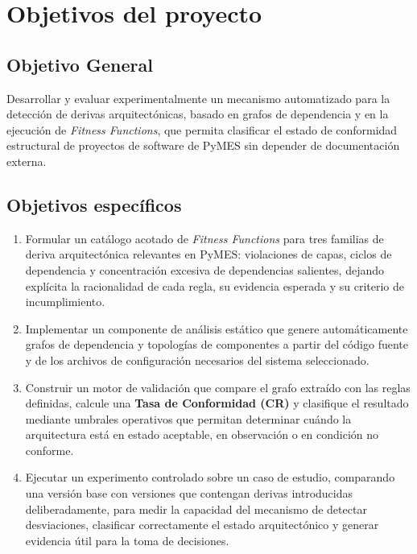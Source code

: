 \section{Objetivos del proyecto}


\subsection{Objetivo General}
Desarrollar y evaluar experimentalmente un mecanismo automatizado para la detección de derivas arquitectónicas, basado en grafos de dependencia y en la ejecución de \textit{Fitness Functions}, que permita clasificar el estado de conformidad estructural de proyectos de software de PyMES sin depender de documentación externa.


\subsection{Objetivos específicos}

\begin{enumerate}
    \item Formular un catálogo acotado de \textit{Fitness Functions} para tres familias de deriva arquitectónica relevantes en PyMES: violaciones de capas, ciclos de dependencia y concentración excesiva de dependencias salientes, dejando explícita la racionalidad de cada regla, su evidencia esperada y su criterio de incumplimiento.
    \item Implementar un componente de análisis estático que genere automáticamente grafos de dependencia y topologías de componentes a partir del código fuente y de los archivos de configuración necesarios del sistema seleccionado.
    \item Construir un motor de validación que compare el grafo extraído con las reglas definidas, calcule una \textbf{Tasa de Conformidad (CR)} y clasifique el resultado mediante umbrales operativos que permitan determinar cuándo la arquitectura está en estado aceptable, en observación o en condición no conforme.
    \item Ejecutar un experimento controlado sobre un caso de estudio, comparando una versión base con versiones que contengan derivas introducidas deliberadamente, para medir la capacidad del mecanismo de detectar desviaciones, clasificar correctamente el estado arquitectónico y generar evidencia útil para la toma de decisiones.

\end{enumerate}